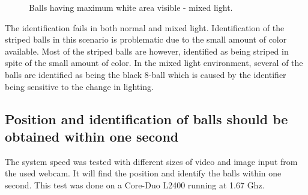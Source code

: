 \begin{figure}[htpb]
  \centering
  \quad
  \quad
   \caption{Balls having maximum white area visible - mixed light.}
  \label{fig:maxmixed}
\end{figure}
The identification fails in both normal and mixed light. Identification of the striped balls in this scenario is problematic due to the small amount of color available. Most of the striped balls are however, identified as being striped in spite of the small amount of color. In the mixed light environment, several of the balls are identified as being the black 8-ball which is caused by the identifier being sensitive to the change in lighting.

\subsection{Position and identification of balls should be obtained within one second}
The system speed was tested with different sizes of video and image input from the used webcam. It will find the position and identify the balls within one second. This test was done on a Core-Duo L2400 running at 1.67 Ghz. 
